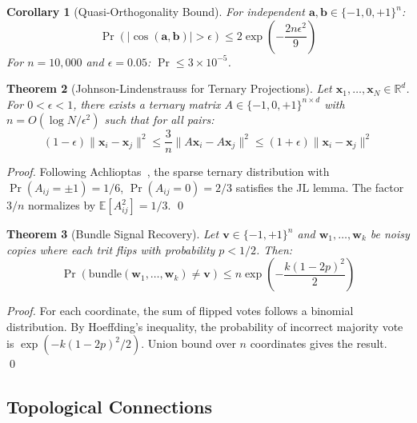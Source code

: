 \documentclass[aps,prd,preprint,superscriptaddress,showpacs,nofootinbib,longbibliography]{revtex4-2}
\newtheorem{theorem}{Theorem}
\newtheorem{corollary}[theorem]{Corollary}
\begin{document}
\begin{corollary}[Quasi-Orthogonality Bound]
\label{cor:quasi_ortho}
For independent $\mathbf{a}, \mathbf{b} \in \{-1, 0, +1\}^n$:
\begin{equation}
\Pr\left(|\cos(\mathbf{a}, \mathbf{b})| > \epsilon\right) \leq 2 \exp\left(-\frac{2n\epsilon^2}{9}\right)
\end{equation}
For $n = 10{,}000$ and $\epsilon = 0.05$: $\Pr \leq 3 \times 10^{-5}$.
\end{corollary}

\begin{theorem}[Johnson-Lindenstrauss for Ternary Projections]
\label{thm:jl_ternary}
Let $\mathbf{x}_1, \ldots, \mathbf{x}_N \in \mathbb{R}^d$. For $0 < \epsilon < 1$, there exists a ternary matrix $A \in \{-1, 0, +1\}^{n \times d}$ with $n = O(\log N / \epsilon^2)$ such that for all pairs:
\begin{equation}
(1-\epsilon) \|\mathbf{x}_i - \mathbf{x}_j\|^2 \leq \frac{3}{n} \|A\mathbf{x}_i - A\mathbf{x}_j\|^2 \leq (1+\epsilon) \|\mathbf{x}_i - \mathbf{x}_j\|^2
\end{equation}
\end{theorem}

\begin{proof}
Following Achlioptas~\cite{achlioptas2003}, the sparse ternary distribution with $\Pr(A_{ij} = \pm 1) = 1/6$, $\Pr(A_{ij} = 0) = 2/3$ satisfies the JL lemma. The factor $3/n$ normalizes by $\mathbb{E}[A_{ij}^2] = 1/3$. \qed
\end{proof}

\begin{theorem}[Bundle Signal Recovery]
\label{thm:bundle_recovery}
Let $\mathbf{v} \in \{-1, +1\}^n$ and $\mathbf{w}_1, \ldots, \mathbf{w}_k$ be noisy copies where each trit flips with probability $p < 1/2$. Then:
\begin{equation}
\Pr\left(\text{bundle}(\mathbf{w}_1, \ldots, \mathbf{w}_k) \neq \mathbf{v}\right) \leq n \exp\left(-\frac{k(1-2p)^2}{2}\right)
\end{equation}
\end{theorem}

\begin{proof}
For each coordinate, the sum of flipped votes follows a binomial distribution. By Hoeffding's inequality, the probability of incorrect majority vote is $\exp(-k(1-2p)^2/2)$. Union bound over $n$ coordinates gives the result. \qed
\end{proof}

\subsection{Topological Connections}
\label{sec:topology}
\end{document}
